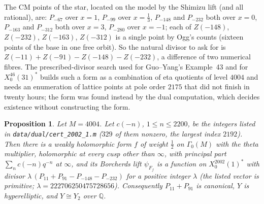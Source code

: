 \documentclass[11pt,reqno]{amsart}
\theoremstyle{plain}
\newtheorem{proposition}[theorem]{Proposition}
\theoremstyle{definition}
\newcommand{\Q}{\mathbb{Q}}
\begin{document}
The CM points of the star, located on the model by the Shimizu lift (and all rational), are:
$P_{-67}$ over $x=1$, $P_{-99}$ over $x=\tfrac13$, $P_{-148}$ and $P_{-232}$ both over $x=0$,
$P_{-163}$ and $P_{-312}$ both over $x=3$, $P_{-280}$ over $x=-1$; each of $Z(-148)$, $Z(-232)$,
$Z(-163)$, $Z(-312)$ is a single point by Ogg's counts (sixteen points of the base in one free
orbit). So the natural divisor to ask for is $Z(-11)+Z(-91)-Z(-148)-Z(-232)$, a difference of two
numerical fibres. The prescribed-divisor search used for Guo--Yang's Example~43 and for
$X_0^{46}(31)^*$ builds such a form as a combination of eta quotients of level $4004$ and needs an
enumeration of lattice points at pole order $2175$ that did not finish in twenty hours; the form
was found instead by the dual computation, which decides existence without constructing the form.

\begin{proposition}\label{prop:dual}
Let $M=4004$. Let $c(-n)$, $1\le n\le2200$, be the integers listed in \texttt{data/dual/cert\_2002\_1.m}
($329$ of them nonzero, the largest index $2192$). Then there is a weakly holomorphic form $f$ of
weight $\tfrac12$ on $\Gamma_0(M)$ with the theta multiplier, holomorphic at every cusp other than
$\infty$, with principal part $\sum_nc(-n)q^{-n}$ at $\infty$, and its Borcherds lift $\psi_{F_f}$
is a function on $X_0^{2002}(1)^*$ with divisor $\lambda\,(P_{11}+P_{91}-P_{-148}-P_{-232})$ for a positive integer $\lambda$ (the listed vector is primitive; $\lambda=222706250475728656$). Consequently
$P_{11}+P_{91}$ is canonical, $Y$ is hyperelliptic, and $Y\cong Y_2$ over $\Q$.
\end{proposition}
\end{document}
